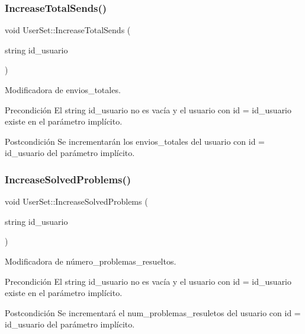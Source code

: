 \subsubsection{\texorpdfstring{Increase\+Total\+Sends()}{IncreaseTotalSends()}}
{\footnotesize\ttfamily void User\+Set\+::\+Increase\+Total\+Sends (\begin{DoxyParamCaption}\item[{string}]{id\+\_\+usuario }\end{DoxyParamCaption})}



Modificadora de envios\+\_\+totales. 

\begin{DoxyPrecond}{Precondición}
El string id\+\_\+usuario no es vacía y el usuario con id = id\+\_\+usuario existe en el parámetro implícito. 
\end{DoxyPrecond}
\begin{DoxyPostcond}{Postcondición}
Se incrementarán los envios\+\_\+totales del usuario con id = id\+\_\+usuario del parámetro implícito. 
\end{DoxyPostcond}
\mbox{\label{class_user_set_a7462310142b0f573b51708d9eb7ead56}} 
\subsubsection{\texorpdfstring{Increase\+Solved\+Problems()}{IncreaseSolvedProblems()}}
{\footnotesize\ttfamily void User\+Set\+::\+Increase\+Solved\+Problems (\begin{DoxyParamCaption}\item[{string}]{id\+\_\+usuario }\end{DoxyParamCaption})}



Modificadora de número\+\_\+problemas\+\_\+resueltos. 

\begin{DoxyPrecond}{Precondición}
El string id\+\_\+usuario no es vacía y el usuario con id = id\+\_\+usuario existe en el parámetro implícito. 
\end{DoxyPrecond}
\begin{DoxyPostcond}{Postcondición}
Se incrementará el num\+\_\+problemas\+\_\+resuletos del usuario con id = id\+\_\+usuario del parámetro implícito. 
\end{DoxyPostcond}
\mbox{\label{class_user_set_aaba14c5d99e15bc568bf6985e77c85af}} 
